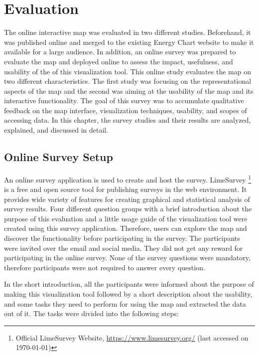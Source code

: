 \chapter{Evaluation}
\label{chap:evaluation}

The online interactive map was evaluated in two different studies. Beforehand, it was published online and merged to the existing Energy Chart website to make it available for a large audience. In addition, an online survey was prepared to evaluate the map and deployed online to assess the impact, usefulness, and usability of the of this visualization tool.  This online study evaluates the map on two different characteristics. The first study was focusing on the representational aspects of the map and the second was aiming at the usability of the map and its interactive functionality. The goal of this survey was to accumulate qualitative feedback on the map interface, visualization techniques, usability, and scopes of accessing data. In this chapter, the survey studies and their results are analyzed, explained, and discussed in detail.

\section{Online Survey Setup}
\label{chap:suveySetup}

An online survey application is used to create and host the survey. LimeSurvey \footnote{Official LimeSurvey Website, \url{https://www.limesurvey.org/} (last accessed on \today)} is a free and open source tool for publishing surveys in the web environment. It provides wide variety of features for creating graphical and statistical analysis of survey results. Four different question groups with a brief introduction about the purpose of this evaluation and a little usage guide of the visualization tool were created using this survey application. Therefore, users can explore the map and discover the functionality before participating in the survey. The participants were invited over the email and social media. They did not get any reward for participating in the online survey. None of the survey questions were mandatory, therefore participants were not required to answer every question. 

In the short introduction, all the participants were informed about the purpose of making this visualization tool followed by a short description about the usability, and some tasks they need to perform for using the map and extracted the data out of it. The tasks were divided into the following steps:

